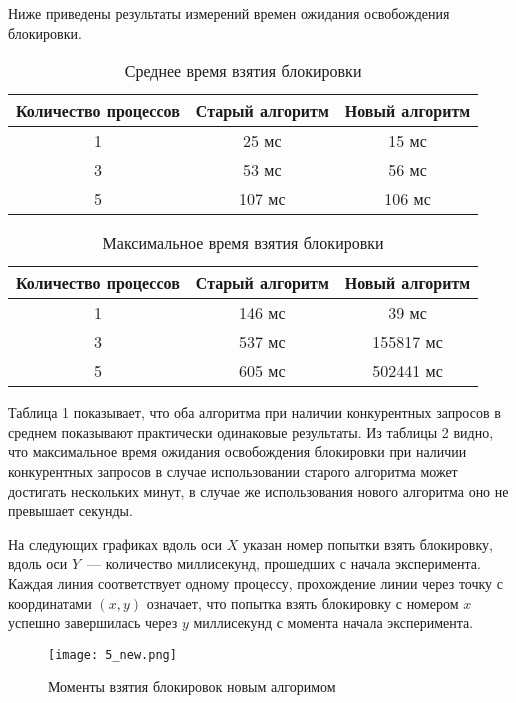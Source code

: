 Ниже приведены результаты измерений времен ожидания освобождения блокировки.

\begin{table}[H]
\caption{\label{tab:summary}Среднее время взятия блокировки}
\begin{center}
\begin{tabular}{|c|c|c|}
\hline
Количество процессов & Старый алгоритм & Новый алгоритм \\
\hline
1 & 25 мс & 15 мс \\
\hline
3 & 53 мс & 56 мс \\
\hline
5 & 107 мс & 106 мс \\
\hline
\end{tabular}
\end{center}

\end{table} \begin{table}[H]
\caption{\label{tab:summary}Максимальное время взятия блокировки}
\begin{center}
\begin{tabular}{|c|c|c|}
\hline
Количество процессов & Старый алгоритм & Новый алгоритм \\
\hline
1 & 146 мс & 39 мс \\
\hline
3 & 537 мс & 155817 мс \\
\hline
5 & 605 мс & 502441 мс \\
\hline
\end{tabular}
\end{center}
\end{table} 

Таблица 1 показывает, что оба алгоритма при наличии конкурентных запросов в среднем показывают практически одинаковые результаты.
Из таблицы 2 видно, что максимальное время ожидания освобождения блокировки при наличии конкурентных запросов в случае использовании старого алгоритма может достигать нескольких минут, в случае же использования нового алгоритма оно не превышает секунды.

На следующих графиках вдоль оси $X$ указан номер попытки взять блокировку, вдоль оси $Y$~--- количество миллисекунд, прошедших с начала эксперимента. Каждая линия соответствует одному процессу, прохождение линии через точку с координатами $(x, y)$ означает, что попытка взять блокировку с номером $x$ успешно завершилась через $y$ миллисекунд с момента начала эксперимента.

\begin{figure}[h!]
  \caption{Моменты взятия блокировок новым алгоримом}
  \centering
    \texttt{[image: 5\_new.png]}
\end{figure}

